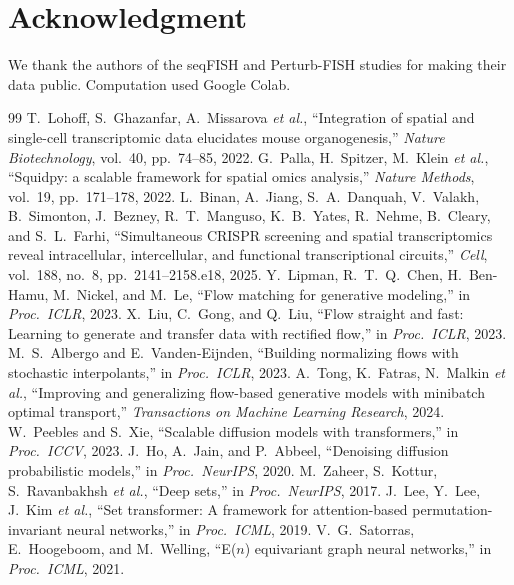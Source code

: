\documentclass[journal]{IEEEtran}
\begin{document}
\section*{Acknowledgment}
We thank the authors of the seqFISH and Perturb-FISH studies for making their data public. Computation used Google Colab.

\begin{thebibliography}{99}
 T.~Lohoff, S.~Ghazanfar, A.~Missarova \emph{et al.}, ``Integration of spatial and single-cell transcriptomic data elucidates mouse organogenesis,'' \emph{Nature Biotechnology}, vol.~40, pp.~74--85, 2022.
 G.~Palla, H.~Spitzer, M.~Klein \emph{et al.}, ``Squidpy: a scalable framework for spatial omics analysis,'' \emph{Nature Methods}, vol.~19, pp.~171--178, 2022.
 L.~Binan, A.~Jiang, S.~A.~Danquah, V.~Valakh, B.~Simonton, J.~Bezney, R.~T.~Manguso, K.~B.~Yates, R.~Nehme, B.~Cleary, and S.~L.~Farhi, ``Simultaneous CRISPR screening and spatial transcriptomics reveal intracellular, intercellular, and functional transcriptional circuits,'' \emph{Cell}, vol.~188, no.~8, pp.~2141--2158.e18, 2025.
 Y.~Lipman, R.~T.~Q.~Chen, H.~Ben-Hamu, M.~Nickel, and M.~Le, ``Flow matching for generative modeling,'' in \emph{Proc.\ ICLR}, 2023.
 X.~Liu, C.~Gong, and Q.~Liu, ``Flow straight and fast: Learning to generate and transfer data with rectified flow,'' in \emph{Proc.\ ICLR}, 2023.
 M.~S.~Albergo and E.~Vanden-Eijnden, ``Building normalizing flows with stochastic interpolants,'' in \emph{Proc.\ ICLR}, 2023.
 A.~Tong, K.~Fatras, N.~Malkin \emph{et al.}, ``Improving and generalizing flow-based generative models with minibatch optimal transport,'' \emph{Transactions on Machine Learning Research}, 2024.
 W.~Peebles and S.~Xie, ``Scalable diffusion models with transformers,'' in \emph{Proc.\ ICCV}, 2023.
 J.~Ho, A.~Jain, and P.~Abbeel, ``Denoising diffusion probabilistic models,'' in \emph{Proc.\ NeurIPS}, 2020.
 M.~Zaheer, S.~Kottur, S.~Ravanbakhsh \emph{et al.}, ``Deep sets,'' in \emph{Proc.\ NeurIPS}, 2017.
 J.~Lee, Y.~Lee, J.~Kim \emph{et al.}, ``Set transformer: A framework for attention-based permutation-invariant neural networks,'' in \emph{Proc.\ ICML}, 2019.
 V.~G.~Satorras, E.~Hoogeboom, and M.~Welling, ``E($n$) equivariant graph neural networks,'' in \emph{Proc.\ ICML}, 2021.

\end{thebibliography}
\end{document}
